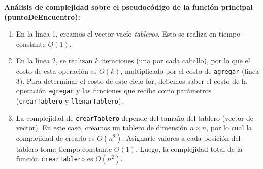 \textbf{Análisis de complejidad sobre el pseudocódigo de la función principal (puntoDeEncuentro):}

\begin{enumerate}
  \item En la línea 1, creamos el vector vacío \textit{tableros}. Esto se realiza en tiempo constante $O(1)$.

  \item En la línea 2, se realizan $k$ iteraciones (una por cada caballo), por lo que el costo de esta operación es $O(k)$, multiplicado por el costo de
  \verb|agregar| (línea 3). Para determinar el costo de este ciclo for, debemos saber el costo de la operación \verb|agregar| y las funciones que recibe como parámetros (\verb|crearTablero| y \verb|llenarTablero|).

  \item La complejidad de \verb|crearTablero| depende del tamaño del tablero
  (vector de vector). En este caso, creamos un tablero de dimensión
  $n \times n$, por lo cual la complejidad de crearlo es $O(n^2)$. Asignarle valores a cada posición del tablero toma tiempo constante $O(1)$. Luego, la
  complejidad total de la función \verb|crearTablero| es $O(n^2)$.


\end{enumerate}
